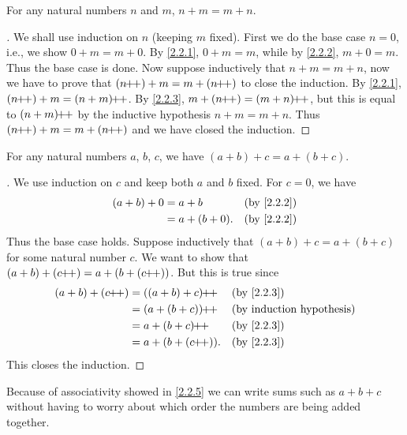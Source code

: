 \begin{prop}\label{2.2.4}
  For any natural numbers \(n\) and \(m\), \(n + m = m + n\).
\end{prop}

\begin{proof}[]
  We shall use induction on \(n\) (keeping \(m\) fixed).
  First we do the base case \(n = 0\), i.e., we show \(0 + m = m + 0\).
  By \cref{2.2.1}, \(0 + m = m\), while by \cref{2.2.2}, \(m + 0 = m\).
  Thus the base case is done.
  Now suppose inductively that \(n + m = m + n\), now we have to prove that \((n\pp) + m = m + (n\pp)\) to close the induction.
  By \cref{2.2.1}, \((n\pp) + m = (n + m)\pp\).
  By \cref{2.2.3}, \(m + (n\pp) = (m + n)\pp\), but this is equal to \((n + m)\!\!+\!\!+\) by the inductive hypothesis \(n+m=m+n\).
  Thus \((n\pp) + m = m + (n\pp)\) and we have closed the induction.
\end{proof}

\begin{prop}\label{2.2.5}
  For any natural numbers \(a\), \(b\), \(c\), we have \((a + b) + c = a + (b + c)\).
\end{prop}

\begin{proof}[]
  We use induction on \(c\) and keep both \(a\) and \(b\) fixed.
  For \(c = 0\), we have
  \begin{align*}
    (a + b) + 0 & = a + b        &  & \by{2.2.2} \\
                & = a + (b + 0). &  & \by{2.2.2}
  \end{align*}
  Thus the base case holds.
  Suppose inductively that \((a + b) + c = a + (b + c)\) for some natural number \(c\).
  We want to show that \((a + b) + (c\pp) = a + (b + (c\pp))\).
  But this is true since
  \begin{align*}
    (a + b) + (c\pp) & = ((a + b) + c)\pp  &  & \by{2.2.3} \\
                     & = (a + (b + c))\pp  &  & \byIH      \\
                     & = a + (b + c)\pp    &  & \by{2.2.3} \\
                     & = a + (b + (c\pp)). &  & \by{2.2.3}
  \end{align*}
  This closes the induction.
\end{proof}

\begin{note}
  Because of associativity showed in \cref{2.2.5} we can write sums such as \(a + b + c\) without having to worry about which order the numbers are being added together.
\end{note}

